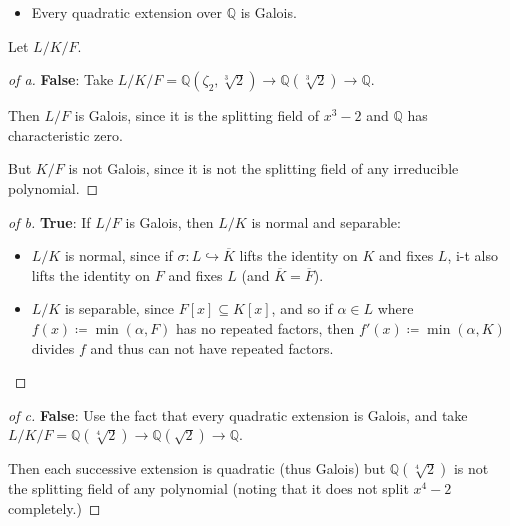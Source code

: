 \begin{concept}

\envlist

\begin{itemize}
\tightlist
\item
  Every quadratic extension over \({\mathbb{Q}}\) is Galois.
\end{itemize}

\end{concept}

\begin{solution}

Let \(L/K/F\).

\begin{proof}[of a]

\textbf{False}: Take
\(L/K/F = {\mathbb{Q}}(\zeta_2, \sqrt[3] 2) \to {\mathbb{Q}}(\sqrt[3] 2) \to {\mathbb{Q}}\).

Then \(L/F\) is Galois, since it is the splitting field of \(x^3 - 2\)
and \({\mathbb{Q}}\) has characteristic zero.

But \(K/F\) is not Galois, since it is not the splitting field of any
irreducible polynomial.

\end{proof}

\begin{proof}[of b]

\textbf{True}: If \(L/F\) is Galois, then \(L/K\) is normal and
separable:

\begin{itemize}
\item
  \(L/K\) is normal, since if \(\sigma: L \hookrightarrow\overline K\)
  lifts the identity on \(K\) and fixes \(L\), i-t also lifts the
  identity on \(F\) and fixes \(L\) (and \(\overline K = \overline F\)).
\item
  \(L/K\) is separable, since \(F[x] \subseteq K[x]\), and so if
  \(\alpha \in L\) where \(f(x) \coloneqq\min(\alpha, F)\) has no
  repeated factors, then \(f'(x) \coloneqq\min(\alpha, K)\) divides
  \(f\) and thus can not have repeated factors.
\end{itemize}

\end{proof}

\begin{proof}[of c]

\textbf{False}: Use the fact that every quadratic extension is Galois,
and take
\(L/K/F = {\mathbb{Q}}(\sqrt[4] 2) \to {\mathbb{Q}}(\sqrt 2) \to {\mathbb{Q}}\).

Then each successive extension is quadratic (thus Galois) but
\({\mathbb{Q}}(\sqrt[4] 2)\) is not the splitting field of any
polynomial (noting that it does not split \(x^4 - 2\) completely.)

\end{proof}

\end{solution}

